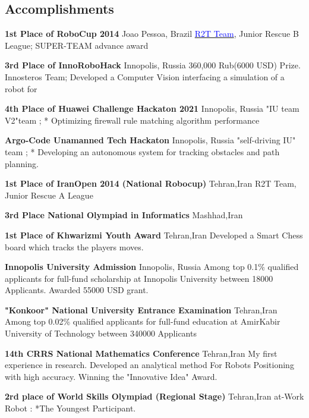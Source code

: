 \subsection{\textbf{Accomplishments}}

{\textbf{1st Place of RoboCup 2014}}
{Joao Pessoa, Brazil}
{}
{}
{
\href{http://www.robocup2014.org/?page_id=3318}{\textcolor{blue}{R2T Team}}, Junior Rescue B League; SUPER-TEAM advance award}


{\textbf{3rd Place of InnoRoboHack }}
{Innopolis, Russia}
{}
{}
{
360,000 Rub(6000 USD) Prize.
Innosteros Team; Developed a Computer Vision interfacing a simulation of a robot for 
}
 
{\textbf{4th Place of Huawei Challenge Hackaton 2021}}
{Innopolis, Russia}
{}
{}
{
"IU team V2"team ; * Optimizing firewall rule matching algorithm performance
 }

{\textbf{Argo-Code Unamanned Tech Hackaton }}
{Innopolis, Russia}
{}
{}
{
"self-driving IU" team ; * Developing an autonomous system for tracking obstacles and path planning. 
} 
 
 
{\textbf{1st Place of IranOpen 2014 (National Robocup)}}
{Tehran,Iran}
{}
{}
{
	R2T Team, Junior Rescue A League
}

{\textbf{3rd Place National Olympiad in Informatics }}
{Mashhad,Iran}
{}
{}
{	
}

{\textbf{1st Place of Khwarizmi Youth Award }}
{Tehran,Iran}
{}
{}
{
    Developed a Smart Chess board which tracks the players moves.
}



{\textbf{Innopolis University Admission}}
{Innopolis, Russia}
{}
{}
{
Among top 0.1\% qualified applicants for full-fund scholarship at Innopolis University between 18000 Applicants. Awarded 55000 USD grant.
}

{\textbf{"Konkoor" National University Entrance Examination}}
{Tehran,Iran}
{}
{}
{
Among top 0.02\% qualified applicants for full-fund education at AmirKabir University of Technology between 340000 Applicants
}
  
{\textbf{14th CRRS National Mathematics Conference}}
{Tehran,Iran}
{}
{}
{
My first experience in research. Developed an analytical method For Robots Positioning with high accuracy. Winning the "Innovative Idea" Award.
}


{\textbf{2rd place of World Skills Olympiad (Regional Stage)}}
{Tehran,Iran}
{}
{}
{
  at-Work Robot : *The Youngest Participant.
}



